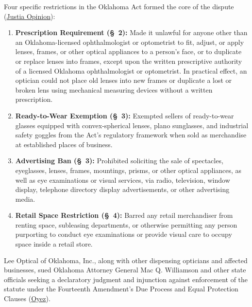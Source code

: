 \documentclass[12pt]{article}
\begin{document}
Four specific restrictions in the Oklahoma Act formed the core of the dispute (\href{https://supreme.justia.com/cases/federal/us/348/483/}{Justia Opinion}):
\begin{enumerate}
    \item \textbf{Prescription Requirement (\S~2):} Made it unlawful for anyone other than an Oklahoma-licensed ophthalmologist or optometrist to fit, adjust, or apply lenses, frames, or other optical appliances to a person's face, or to duplicate or replace lenses into frames, except upon the written prescriptive authority of a licensed Oklahoma ophthalmologist or optometrist. In practical effect, an optician could not place old lenses into new frames or duplicate a lost or broken lens using mechanical measuring devices without a written prescription.
    \item \textbf{Ready-to-Wear Exemption (\S~3):} Exempted sellers of ready-to-wear glasses equipped with convex-spherical lenses, plano sunglasses, and industrial safety goggles from the Act's regulatory framework when sold as merchandise at established places of business.
    \item \textbf{Advertising Ban (\S~3):} Prohibited soliciting the sale of spectacles, eyeglasses, lenses, frames, mountings, prisms, or other optical appliances, as well as eye examinations or visual services, via radio, television, window display, telephone directory display advertisements, or other advertising media.
    \item \textbf{Retail Space Restriction (\S~4):} Barred any retail merchandiser from renting space, subleasing departments, or otherwise permitting any person purporting to conduct eye examinations or provide visual care to occupy space inside a retail store.
\end{enumerate}

Lee Optical of Oklahoma, Inc., along with other dispensing opticians and affected businesses, sued Oklahoma Attorney General Mac Q. Williamson and other state officials seeking a declaratory judgment and injunction against enforcement of the statute under the Fourteenth Amendment's Due Process and Equal Protection Clauses (\href{https://www.oyez.org/cases/1940-1955/348us483}{Oyez}).
\end{document}
